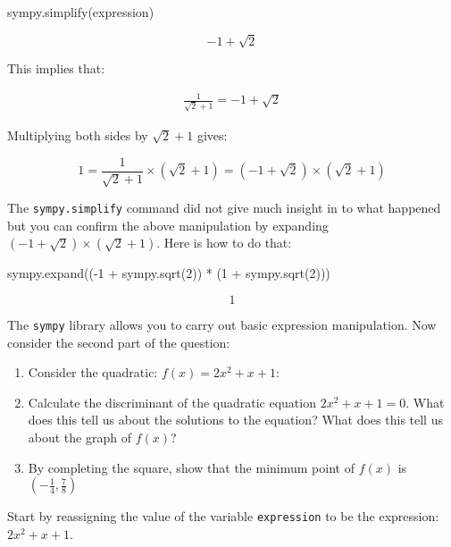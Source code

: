 \begin{pyin}
sympy.simplify(expression)
\end{pyin}

\[ -1 + \sqrt{2}\]

This implies that:

\begin{equation*}
\begin{split}
    \frac{1}{\sqrt{2} + 1} = -1 + \sqrt{2}
\end{split}
\end{equation*}

Multiplying both sides by \({\sqrt{2} + 1}\) gives:

\[
1=\frac{1}{\sqrt{2} + 1}\times \left(\sqrt{2} + 1\right) = \left(-1 + \sqrt{2}\right)\times \left(\sqrt{2} + 1\right)
\]

The \texttt{sympy.simplify} command did not give much insight in to what happened
but you can confirm the above manipulation by expanding \(\left(-1 +
\sqrt{2}\right)\times \left(\sqrt{2} + 1\right)\).
Here is how to do that:

\begin{pyin}
sympy.expand((-1 + sympy.sqrt(2)) * (1 + sympy.sqrt(2)))
\end{pyin}

\[
1
\]

The \texttt{sympy} library allows you to carry out basic expression manipulation.
Now consider the second part of the question:

\begin{enumerate}

\item 

Consider the quadratic: \(f(x)=2x ^ 2 + x + 1\):

\item 

Calculate the discriminant of the quadratic equation \(2x ^ 2 + x + 1 =
0\). What does this tell us about the solutions to the equation? What
does this tell us about the graph of \(f(x)\)?

\item 

By completing the square, show that the minimum point of \(f(x)\) is
\(\left(-\frac{1}{4}, \frac{7}{8}\right)\)

\end{enumerate}


Start by reassigning the value of the variable \texttt{expression} to be the
expression: \(2x ^ 2 + x + 1\).

